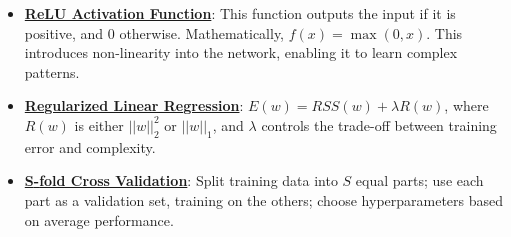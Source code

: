 \documentclass{article}%
\begin{document}
\begin{itemize}[leftmargin=*]
\item \href{https://purdue.brightspace.com/d2l/common/assets/pdfjs-d2l-dist/1.0.14-legacy/web/viewer.html?file=\%2Fcontent\%2Fenforced\%2F1095467-wl.202510.CS.24300.001\%2F09L1-cnn.pdf\%3Fou\%3D1095467\&lang=en-us\&container=d2l-fileviewer-rendered-pdf\&fullscreen=d2l-fileviewer-rendered-pdf-dialog\&height=667#page=13}{\textbf{ReLU Activation Function}}: This function outputs the input if it is positive, and 0 otherwise. Mathematically, $f(x) = \max(0, x)$. This introduces non-linearity into the network, enabling it to learn complex patterns.%
\end{itemize}%
\begin{itemize}[leftmargin=*]%
\item \href{https://purdue.brightspace.com/d2l/common/assets/pdfjs-d2l-dist/1.0.14-legacy/web/viewer.html?file=\%2Fcontent\%2Fenforced\%2F1095467-wl.202510.CS.24300.001\%2F10L1-CrossValidation.pdf\%3Fou\%3D1095467\&lang=en-us\&container=d2l-fileviewer-rendered-pdf\&fullscreen=d2l-fileviewer-rendered-pdf-dialog\&height=667#page=17}{\textbf{Regularized Linear Regression}}: $E(w) = RSS(w) + \lambda R(w)$, where $R(w)$ is either $||w||_2^2$ or $||w||_1$, and $\lambda$ controls the trade-off between training error and complexity.%
\item \href{https://purdue.brightspace.com/d2l/common/assets/pdfjs-d2l-dist/1.0.14-legacy/web/viewer.html?file=\%2Fcontent\%2Fenforced\%2F1095467-wl.202510.CS.24300.001\%2F10L1-CrossValidation.pdf\%3Fou\%3D1095467\&lang=en-us\&container=d2l-fileviewer-rendered-pdf\&fullscreen=d2l-fileviewer-rendered-pdf-dialog\&height=667#page=25}{\textbf{S{-}fold Cross Validation}}: Split training data into $S$ equal parts; use each part as a validation set, training on the others; choose hyperparameters based on average performance.%
\end{itemize}%
\end{document}
